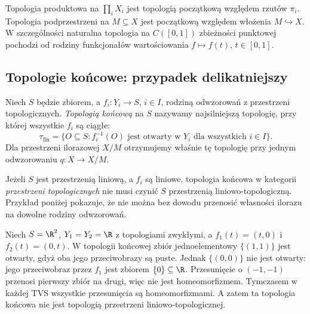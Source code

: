 \begin{przyklad}
Topologia produktowa na $\prod_iX_i$ jest topologią
początkową względem rzutów $\pi_i$.
Topologia podprzestrzeni na $M\subseteq X$ jest
początkową względem włożenia $M\hookrightarrow X$.
W szczególności naturalna topologia na $C([0,1])$
zbieżności punktowej pochodzi od rodziny funkcjonałów
wartościowania $f\mapsto f(t)$, $t\in[0,1]$.
\end{przyklad}

\subsection{Topologie końcowe: przypadek delikatniejszy}

\begin{definicja}
Niech $S$ będzie zbiorem, a $f_i:Y_i\to S$, $i\in I$,
rodziną odwzorowań z przestrzeni topologicznych.
\emph{Topologią końcową} na $S$ nazywamy najsilniejszą
topologię, przy której wszystkie $f_i$ są ciągłe:
\[
 \tau_{\mathrm{fin}}=\{O\subseteq S:
    f_i^{-1}(O)\text{ jest otwarty w }Y_i
    \text{ dla wszystkich }i\in I\}.
\]
Dla przestrzeni ilorazowej $X/M$ otrzymujemy właśnie
tę topologię przy jednym odwzorowaniu $q:X\to X/M$.
\end{definicja}

\begin{uwaga}
Jeżeli $S$ jest przestrzenią liniową, a $f_i$ są liniowe,
topologia końcowa w kategorii \emph{przestrzeni topologicznych}
nie musi czynić $S$ przestrzenią liniowo-topologiczną.
Przykład poniżej pokazuje, że nie można bez dowodu
przenosić własności ilorazu na dowolne rodziny odwzorowań.
\end{uwaga}

\begin{przyklad}\label{ex:final-cross}
Niech $S=\R^2$, $Y_1=Y_2=\R$ z topologiami zwykłymi,
a $f_1(t)=(t,0)$ i $f_2(t)=(0,t)$. W topologii końcowej
zbiór jednoelementowy $\{(1,1)\}$ jest otwarty,
gdyż oba jego przeciwobrazy są puste. Jednak $\{(0,0)\}$
nie jest otwarty: jego przeciwobraz przez $f_1$ jest
zbiorem $\{0\}\subseteq\R$. Przesunięcie o $(-1,-1)$
przenosi pierwszy zbiór na drugi, więc nie jest
homeomorfizmem. Tymczasem w każdej TVS wszystkie
przesunięcia są homeomorfizmami. A zatem ta topologia
końcowa nie jest topologią przestrzeni liniowo-topologicznej.
\end{przyklad}

